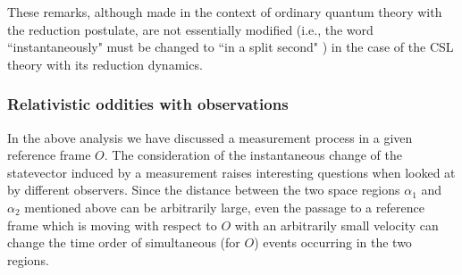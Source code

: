 \documentclass[10pt,a4paper]{article}
\begin{document}
These remarks, although made in the context of ordinary quantum
theory with the reduction postulate, are not essentially modified
(i.e., the word ``instantaneously" must be changed to ``in a split
second" \cite{bells}) in the case of the CSL theory with its
reduction dynamics.

\subsubsection{Relativistic oddities with observations}
\label{sec1013}

In the above analysis we have discussed a measurement process in a
given reference frame $O$. The consideration of the instantaneous
change of the statevector induced by a measurement raises
interesting questions when looked at by different observers. Since
the distance between the two space regions $\alpha_{1}$ and
$\alpha_{2}$ mentioned above can be arbitrarily large, even the
passage to a reference frame which is moving with respect to $O$
with an arbitrarily small velocity can change the time order of
simultaneous (for $O$) events occurring in the two regions.
\end{document}
